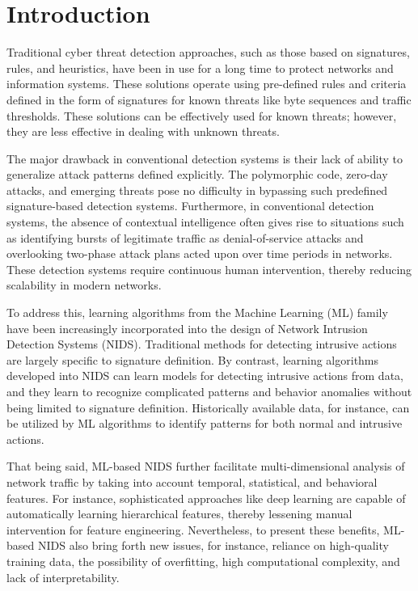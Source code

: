 \chapter{Introduction}
\label{cha:intro}

Traditional cyber threat detection approaches, such as those based on signatures, rules, and heuristics, have been in use for a long time to protect networks and information systems. These solutions operate using pre-defined rules and criteria defined in the form of signatures for known threats like byte sequences and traffic thresholds. These solutions can be effectively used for known threats; however, they are less effective in dealing with unknown threats.

The major drawback in conventional detection systems is their lack of ability to generalize attack patterns defined explicitly. The polymorphic code, zero-day attacks, and emerging threats pose no difficulty in bypassing such predefined signature-based detection systems. Furthermore, in conventional detection systems, the absence of contextual intelligence often gives rise to situations such as identifying bursts of legitimate traffic as denial-of-service attacks and overlooking two-phase attack plans acted upon over time periods in networks. These detection systems require continuous human intervention, thereby reducing scalability in modern networks.

To address this, learning algorithms from the Machine Learning (ML) family have been increasingly incorporated into the design of Network Intrusion Detection Systems (NIDS). Traditional methods for detecting intrusive actions are largely specific to signature definition. By contrast, learning algorithms developed into NIDS can learn models for detecting intrusive actions from data, and they learn to recognize complicated patterns and behavior anomalies without being limited to signature definition. Historically available data, for instance, can be utilized by ML algorithms to identify patterns for both normal and intrusive actions.

That being said, ML-based NIDS further facilitate multi-dimensional analysis of network traffic by taking into account temporal, statistical, and behavioral features. For instance, sophisticated approaches like deep learning are capable of automatically learning hierarchical features, thereby lessening manual intervention for feature engineering. Nevertheless, to present these benefits, ML-based NIDS also bring forth new issues, for instance, reliance on high-quality training data, the possibility of overfitting, high computational complexity, and lack of interpretability. 

